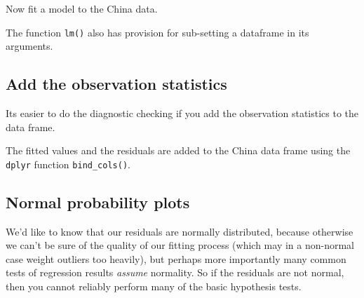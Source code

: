 \documentclass[titlepage]{book}\usepackage{knitr}
\begin{document}
Now fit a model to the China data.

\begin{knitrout}
\color{fgcolor}\begin{kframe}
\begin{alltt}
 \hlkwb{<-}   \hlopt{~}  \hlopt{+}  \hlopt{+}  \hlopt{+}  \hlopt{+} 
                     
\end{alltt}
\end{kframe}
\end{knitrout}
The function \texttt{lm()} also has provision for sub-setting a dataframe in its arguments.

\subsection{Add the observation statistics}
Its easier to do the diagnostic checking if you add the observation statistics to the data frame.

\begin{knitrout}
\color{fgcolor}\begin{kframe}
\begin{alltt}
 \hlkwb{<-} 
  \hlkwb{<-} 
 \hlkwb{<-} 
\hlkwb{<-} 
 \hlstd{(}
\end{alltt}
\end{kframe}
\end{knitrout}
 
 The fitted values  and the residuals  are added to the China data frame using the \texttt{dplyr} function \texttt{bind\_cols()}.

\subsection{Normal probability plots}
We'd like to know that our residuals are normally distributed, because otherwise we can't be sure of the quality of our fitting process (which may in a non-normal case weight outliers too heavily), but perhaps more importantly many common tests of regression results \emph{assume} normality. So if the residuals are not normal, then you cannot reliably perform many of the basic hypothesis tests.
\end{document}
